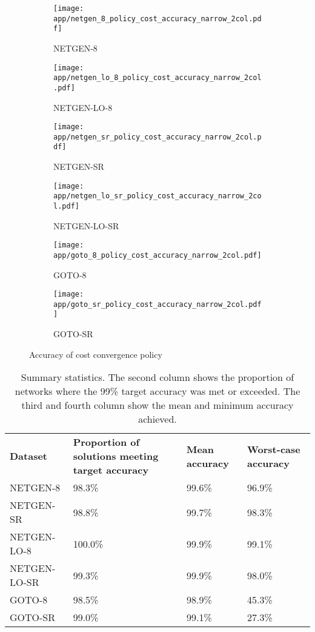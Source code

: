 \begin{figure}
    \begin{widepage}
        \begin{subfigure}[c]{0.5\textwidth}
            \texttt{[image: app/netgen\_8\_policy\_cost\_accuracy\_narrow\_2col.pdf]}
            \caption{NETGEN-8}
        \end{subfigure}
        \begin{subfigure}[c]{0.5\textwidth}
            \texttt{[image: app/netgen\_lo\_8\_policy\_cost\_accuracy\_narrow\_2col.pdf]}
            \caption{NETGEN-LO-8}
            \label{fig:app-general-cost-accuracy-cdf:netgen-lo-8}
        \end{subfigure}
        \begin{subfigure}[c]{0.5\textwidth}
            \texttt{[image: app/netgen\_sr\_policy\_cost\_accuracy\_narrow\_2col.pdf]}
            \caption{NETGEN-SR}
        \end{subfigure}
        \begin{subfigure}[c]{0.5\textwidth}
            \texttt{[image: app/netgen\_lo\_sr\_policy\_cost\_accuracy\_narrow\_2col.pdf]}
            \caption{NETGEN-LO-SR}
            \label{fig:app-general-cost-accuracy-cdf:netgen-lo-sr}
        \end{subfigure}
        \begin{subfigure}[c]{0.5\textwidth}
            \texttt{[image: app/goto\_8\_policy\_cost\_accuracy\_narrow\_2col.pdf]}
            \caption{GOTO-8}
        \end{subfigure}
        \begin{subfigure}[c]{0.5\textwidth}
            \texttt{[image: app/goto\_sr\_policy\_cost\_accuracy\_narrow\_2col.pdf]}
            \caption{GOTO-SR}
        \end{subfigure}
    \end{widepage}
    \caption{Accuracy of cost convergence policy}
    \label{fig:app-general-cost-accuracy-cdf}
\end{figure}

\begin{table}
    \centering
    \begin{tabular}{lp{}p{}p{}}
        \textbf{Dataset} & \textbf{Proportion of solutions meeting target accuracy} & \textbf{Mean accuracy} & \textbf{Worst-case accuracy} \tabularnewline
        NETGEN-8 & 98.3\% & 99.6\% & 96.9\% \tabularnewline
        NETGEN-SR & 98.8\% & 99.7\% & 98.3\% \tabularnewline
        NETGEN-LO-8 & 100.0\% & 99.9\% & 99.1\% \tabularnewline
        NETGEN-LO-SR & 99.3\% & 99.9\% & 98.0\% \tabularnewline
        GOTO-8 & 98.5\% & 98.9\% & 45.3\% \tabularnewline
        GOTO-SR & 99.0\% & 99.1\% & 27.3\% \tabularnewline
    \end{tabular}
    \caption{Summary statistics. The second column shows the proportion of networks where the 99\% target accuracy was met or exceeded. The third and fourth column show the mean and minimum accuracy achieved.}
    \label{table:app-general-outliers}
\end{table}

